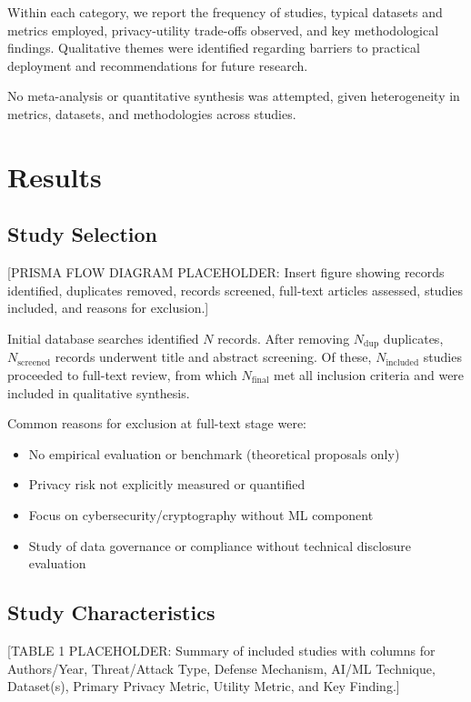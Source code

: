 \documentclass[11pt,a4paper]{article}
\begin{document}
Within each category, we report the frequency of studies, typical datasets and metrics employed, privacy-utility trade-offs observed, and key methodological findings. Qualitative themes were identified regarding barriers to practical deployment and recommendations for future research.

No meta-analysis or quantitative synthesis was attempted, given heterogeneity in metrics, datasets, and methodologies across studies.

\section{Results}

\subsection{Study Selection}

[PRISMA FLOW DIAGRAM PLACEHOLDER: Insert figure showing records identified, duplicates removed, records screened, full-text articles assessed, studies included, and reasons for exclusion.]

Initial database searches identified $N$ records. After removing $N_{\text{dup}}$ duplicates, $N_{\text{screened}}$ records underwent title and abstract screening. Of these, $N_{\text{included}}$ studies proceeded to full-text review, from which $N_{\text{final}}$ met all inclusion criteria and were included in qualitative synthesis.

Common reasons for exclusion at full-text stage were:
\begin{itemize}
\item No empirical evaluation or benchmark (theoretical proposals only)
\item Privacy risk not explicitly measured or quantified
\item Focus on cybersecurity/cryptography without ML component
\item Study of data governance or compliance without technical disclosure evaluation
\end{itemize}

\subsection{Study Characteristics}

[TABLE 1 PLACEHOLDER: Summary of included studies with columns for Authors/Year, Threat/Attack Type, Defense Mechanism, AI/ML Technique, Dataset(s), Primary Privacy Metric, Utility Metric, and Key Finding.]
\end{document}

